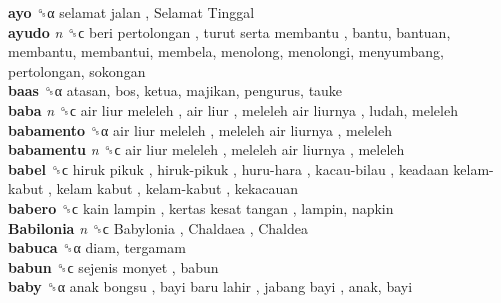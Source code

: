 \textbf{ayo} ␝α   selamat jalan ,  Selamat Tinggal   \\
\textbf{ayudo} \emph{n}  ␝ϲ   beri pertolongan ,  turut serta membantu , bantu, bantuan, membantu, membantui, membela, menolong, menolongi, menyumbang, pertolongan, sokongan  \\
\textbf{baas} ␝α  atasan, bos, ketua, majikan, pengurus, tauke  \\
\textbf{baba} \emph{n}  ␝ϲ   air liur meleleh ,  air liur ,  meleleh air liurnya , ludah, meleleh  \\
\textbf{babamento} ␝α   air liur meleleh ,  meleleh air liurnya , meleleh  \\
\textbf{babamentu} \emph{n}  ␝ϲ   air liur meleleh ,  meleleh air liurnya , meleleh  \\
\textbf{babel} ␝ϲ   hiruk pikuk ,  hiruk-pikuk ,  huru-hara ,  kacau-bilau ,  keadaan kelam-kabut ,  kelam kabut ,  kelam-kabut , kekacauan  \\
\textbf{babero} ␝ϲ   kain lampin ,  kertas kesat tangan , lampin, napkin  \\
\textbf{Babilonia} \emph{n}  ␝ϲ   Babylonia ,  Chaldaea ,  Chaldea   \\
\textbf{babuca} ␝α  diam, tergamam  \\
\textbf{babun} ␝ϲ   sejenis monyet , babun  \\
\textbf{baby} ␝α   anak bongsu ,  bayi baru lahir ,  jabang bayi , anak, bayi  \\
